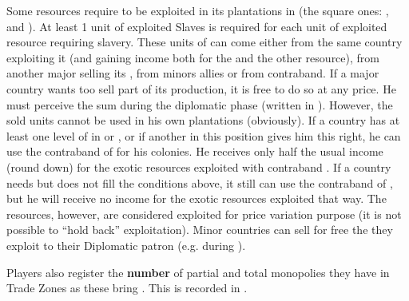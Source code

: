 \label{chIncomes:NeedSlaves}
Some resources require  to be exploited in its plantations
in  (the square ones: ,  and ). At least 1 unit of exploited Slaves is
required for each unit of exploited resource requiring slavery.
 These units of  can come either
from the same country exploiting it (and gaining income both for the
 and the other resource), from another major selling its
, from minors allies or from contraband.
 If a major country wants too sell part of
its  production, it is free to do so at any price. He must
perceive the sum during the diplomatic phase (written in
). However, the sold  units
cannot be used in his own plantations (obviously).
 If a country has at least one level of
\TradeFLEET in  or , or if another \MAJ in this
position gives him this right, he can use the contraband of 
for his colonies. He receives only half the usual income (round down)
for the exotic resources exploited with contraband .
 If a country needs  but
does not fill the conditions above, it still can use the contraband of
, but he will receive no income for the exotic resources
exploited that way. The resources, however, are considered exploited for
price variation purpose (it is not possible to ``hold back''
exploitation).
 Minor countries can sell for free the
 they exploit to their Diplomatic patron
(e.g.  during ).

\aparag Players also register the \textbf{number} of partial and total
monopolies they have in Trade Zones as these bring \VPs. This is
recorded in .


